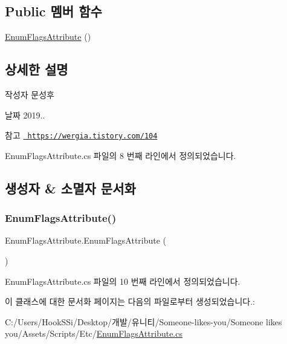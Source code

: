 \subsection*{Public 멤버 함수}
\begin{DoxyCompactItemize}
\item 
\mbox{\hyperlink{class_enum_flags_attribute_a5b29527c68c91ff6fc3dd9e26c2253b8}{Enum\+Flags\+Attribute}} ()
\end{DoxyCompactItemize}


\subsection{상세한 설명}
\begin{DoxyAuthor}{작성자}
문성후 
\end{DoxyAuthor}
\begin{DoxyDate}{날짜}
2019.. 
\end{DoxyDate}
\begin{DoxySeeAlso}{참고}
\href{https://wergia.tistory.com/104}{\texttt{ https\+://wergia.\+tistory.\+com/104}} 
\end{DoxySeeAlso}


Enum\+Flags\+Attribute.\+cs 파일의 8 번째 라인에서 정의되었습니다.



\subsection{생성자 \& 소멸자 문서화}
\mbox{\label{class_enum_flags_attribute_a5b29527c68c91ff6fc3dd9e26c2253b8}} 
\subsubsection{\texorpdfstring{EnumFlagsAttribute()}{EnumFlagsAttribute()}}
{\footnotesize\ttfamily Enum\+Flags\+Attribute.\+Enum\+Flags\+Attribute (\begin{DoxyParamCaption}{ }\end{DoxyParamCaption})}



Enum\+Flags\+Attribute.\+cs 파일의 10 번째 라인에서 정의되었습니다.


\begin{DoxyCode}{0}

\end{DoxyCode}


이 클래스에 대한 문서화 페이지는 다음의 파일로부터 생성되었습니다.\+:\begin{DoxyCompactItemize}
\item 
C\+:/\+Users/\+Hook\+S\+Si/\+Desktop/개발/유니티/\+Someone-\/likes-\/you/\+Someone likes you/\+Assets/\+Scripts/\+Etc/\mbox{\hyperlink{_enum_flags_attribute_8cs}{Enum\+Flags\+Attribute.\+cs}}\end{DoxyCompactItemize}
